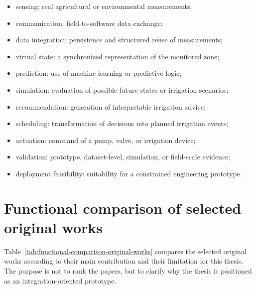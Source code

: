 \begin{itemize}
    \item sensing: real agricultural or environmental measurements;
    \item communication: field-to-software data exchange;
    \item data integration: persistence and structured reuse of measurements;
    \item virtual state: a synchronized representation of the monitored zone;
    \item prediction: use of machine learning or predictive logic;
    \item simulation: evaluation of possible future states or irrigation scenarios;
    \item recommendation: generation of interpretable irrigation advice;
    \item scheduling: transformation of decisions into planned irrigation events;
    \item actuation: command of a pump, valve, or irrigation device;
    \item validation: prototype, dataset-level, simulation, or field-scale evidence;
    \item deployment feasibility: suitability for a constrained engineering prototype.
\end{itemize}

\section{Functional comparison of selected original works}

Table~\ref{tab:functional-comparison-original-works} compares the selected original works according to their main contribution and their limitation for this thesis. The purpose is not to rank the papers, but to clarify why the thesis is positioned as an integration-oriented prototype.

